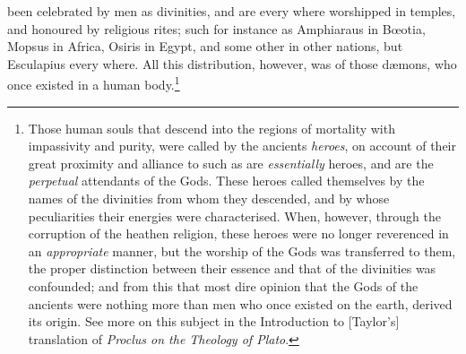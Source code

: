 \documentclass{article}
\begin{document}
been celebrated by men as divinities, and are every where worshipped in
temples, and honoured by religious rites; such for instance as Amphiaraus in
B{\oe}otia, Mopsus in Africa, Osiris in Egypt, and some other in other nations,
but Esculapius every where. All this distribution, however, was of those
d{\ae}mons, who once existed in a human body.\footnote{Those human souls that
descend into the regions of mortality with impassivity and purity, were called
by the ancients \textit{heroes}, on account of their great proximity and
alliance to such as are \textit{essentially} heroes, and are the
\textit{perpetual} attendants of the Gods. These heroes called themselves by
the names of the divinities from whom they descended, and by whose
peculiarities their energies were characterised. When, however, through the
corruption of the heathen religion, these heroes were no longer reverenced in
an \textit{appropriate} manner, but the worship of the Gods was transferred to
them, the proper distinction between their essence and that of the divinities
was confounded; and from this that most dire opinion that the Gods of the
ancients were nothing more than men who once existed on the earth, derived its
origin. See more on this subject in the Introduction to [Taylor's] translation
of \textit{Proclus on the Theology of Plato}.}
\end{document}
